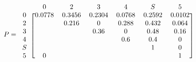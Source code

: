 \begin{equation*}
P=
\begin{blockarray}{ccccccc}
 & 0 & 2 & 3 & 4 & S & 5 \\
\begin{block}{c[cccccc]}
0	&	0.0778	& 0.3456	& 0.2304  	& 0.0768	& 0.2592	& 0.0102 \\
2	&			& 0.216		& 0  		&0.288		& 0.432		& 0.064 \\
3	&			& 			& 0.36		& 0			& 0.48		& 0.16 \\
4	&			& 			& 			& 0.6		& 0.4		& 0\\
S	&			& 			& 			& 			& 1			& 0\\
5	&	0		& 			& 		  	& 			& 			& 1\\
\end{block}
\end{blockarray}
\label{exampleMatrixValues}
\end{equation*}
\newpage
